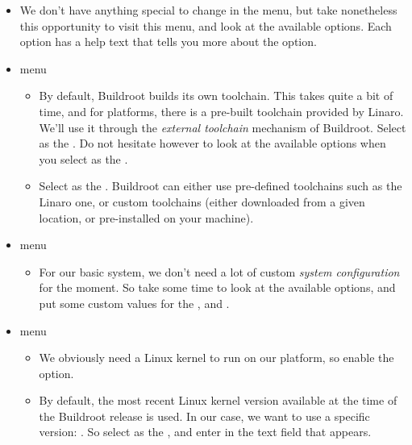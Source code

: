 \begin{itemize}
\item We don't have anything special to change in the
   menu, but take nonetheless this opportunity to
  visit this menu, and look at the available options. Each option has
  a help text that tells you more about the option.

\item {} menu

  \begin{itemize}

  \item By default, Buildroot builds its own toolchain. This takes
    quite a bit of time, and for  platforms, there is a
    pre-built toolchain provided by Linaro. We'll use it through the
    {\em external toolchain} mechanism of Buildroot. Select
     as the . Do not
    hesitate however to look at the available options when you select
     as the .

  \item Select  as the
    . Buildroot can either use pre-defined toolchains
    such as the Linaro one, or custom toolchains (either downloaded
    from a given location, or pre-installed on your machine).

  \end{itemize}

\item {} menu

  \begin{itemize}

  \item For our basic system, we don't need a lot of custom {\em
      system configuration} for the moment. So take some time to look
    at the available options, and put some custom values for the
    ,  and .

  \end{itemize}

\item {} menu

  \begin{itemize}

  \item We obviously need a Linux kernel to run on our platform, so
    enable the  option.

  \item By default, the most recent Linux kernel version available at
    the time of the Buildroot release is used. In our case, we want to
    use a specific version: . So select  as the , and enter  in
    the  text field that appears.


\end{itemize}
\end{itemize}
